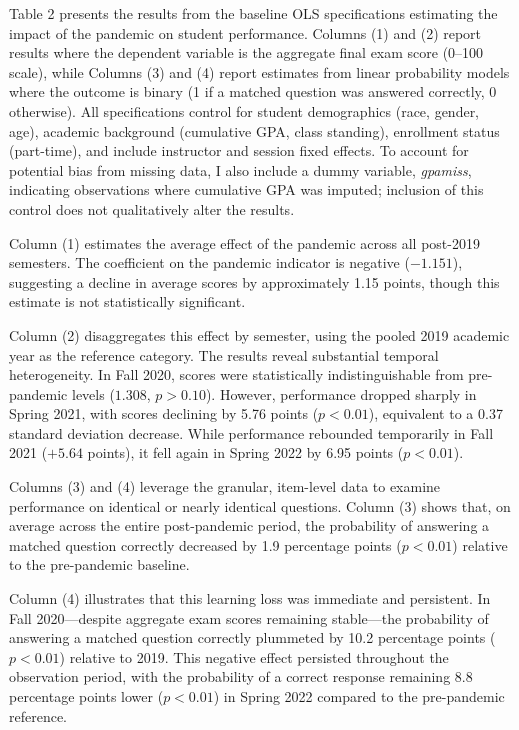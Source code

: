 \documentclass[
  12pt,
  letterpaper,
  DIV=11,
  numbers=noendperiod]{scrartcl}
\begin{document}
Table 2 presents the results from the baseline OLS specifications
estimating the impact of the pandemic on student performance. Columns
(1) and (2) report results where the dependent variable is the aggregate
final exam score (0--100 scale), while Columns (3) and (4) report
estimates from linear probability models where the outcome is binary (1
if a matched question was answered correctly, 0 otherwise). All
specifications control for student demographics (race, gender, age),
academic background (cumulative GPA, class standing), enrollment status
(part-time), and include instructor and session fixed effects. To
account for potential bias from missing data, I also include a dummy
variable, \emph{gpamiss}, indicating observations where cumulative GPA
was imputed; inclusion of this control does not qualitatively alter the
results.

Column (1) estimates the average effect of the pandemic across all
post-2019 semesters. The coefficient on the pandemic indicator is
negative (\(-1.151\)), suggesting a decline in average scores by
approximately 1.15 points, though this estimate is not statistically
significant.

Column (2) disaggregates this effect by semester, using the pooled 2019
academic year as the reference category. The results reveal substantial
temporal heterogeneity. In Fall 2020, scores were statistically
indistinguishable from pre-pandemic levels (\(1.308\), \(p > 0.10\)).
However, performance dropped sharply in Spring 2021, with scores
declining by 5.76 points (\(p < 0.01\)), equivalent to a 0.37 standard
deviation decrease. While performance rebounded temporarily in Fall 2021
(\(+5.64\) points), it fell again in Spring 2022 by 6.95 points
(\(p < 0.01\)).

Columns (3) and (4) leverage the granular, item-level data to examine
performance on identical or nearly identical questions. Column (3) shows
that, on average across the entire post-pandemic period, the probability
of answering a matched question correctly decreased by 1.9 percentage
points (\(p < 0.01\)) relative to the pre-pandemic baseline.

Column (4) illustrates that this learning loss was immediate and
persistent. In Fall 2020---despite aggregate exam scores remaining
stable---the probability of answering a matched question correctly
plummeted by 10.2 percentage points (\(p < 0.01\)) relative to 2019.
This negative effect persisted throughout the observation period, with
the probability of a correct response remaining 8.8 percentage points
lower (\(p < 0.01\)) in Spring 2022 compared to the pre-pandemic
reference.
\end{document}
